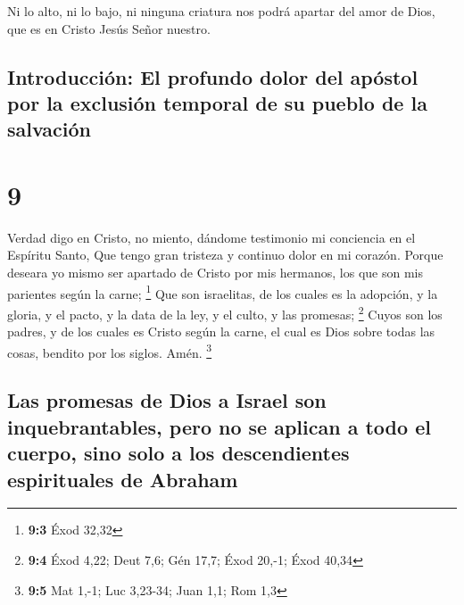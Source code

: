 Ni lo alto, ni lo bajo, ni ninguna criatura nos podrá
apartar del amor de Dios, que es en Cristo Jesús Señor nuestro.

\hypertarget{introducciuxf3n-el-profundo-dolor-del-apuxf3stol-por-la-exclusiuxf3n-temporal-de-su-pueblo-de-la-salvaciuxf3n}{%
\subsection{Introducción: El profundo dolor del apóstol por la exclusión
temporal de su pueblo de la
salvación}\label{introducciuxf3n-el-profundo-dolor-del-apuxf3stol-por-la-exclusiuxf3n-temporal-de-su-pueblo-de-la-salvaciuxf3n}}

\hypertarget{section-8}{%
\section{9}\label{section-8}}

 Verdad digo en Cristo, no miento, dándome testimonio mi
conciencia en el Espíritu Santo,  Que tengo gran tristeza y
continuo dolor en mi corazón.  Porque deseara yo mismo ser
apartado de Cristo por mis hermanos, los que son mis parientes según la
carne; \footnote{\textbf{9:3} Éxod 32,32}  Que son
israelitas, de los cuales es la adopción, y la gloria, y el pacto, y la
data de la ley, y el culto, y las promesas; \footnote{\textbf{9:4} Éxod
  4,22; Deut 7,6; Gén 17,7; Éxod 20,-1; Éxod 40,34}  Cuyos
son los padres, y de los cuales es Cristo según la carne, el cual es
Dios sobre todas las cosas, bendito por los siglos. Amén. \footnote{\textbf{9:5}
  Mat 1,-1; Luc 3,23-34; Juan 1,1; Rom 1,3}

\hypertarget{las-promesas-de-dios-a-israel-son-inquebrantables-pero-no-se-aplican-a-todo-el-cuerpo-sino-solo-a-los-descendientes-espirituales-de-abraham}{%
\subsection{Las promesas de Dios a Israel son inquebrantables, pero no
se aplican a todo el cuerpo, sino solo a los descendientes espirituales
de
Abraham}\label{las-promesas-de-dios-a-israel-son-inquebrantables-pero-no-se-aplican-a-todo-el-cuerpo-sino-solo-a-los-descendientes-espirituales-de-abraham}}

